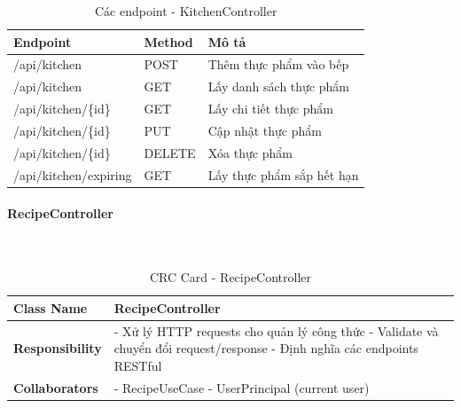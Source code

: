 \begin{table}[H]
\small
\renewcommand{\arraystretch}{1.3}
\begin{tabularx}{\textwidth}{|>{\raggedright\arraybackslash}p{4.5cm}|>{\raggedright\arraybackslash}p{2cm}|X|}
\hline
\rowcolor{gray!20}
\textbf{Endpoint} & \textbf{Method} & \textbf{Mô tả} \\
\hline
/api/kitchen & POST & Thêm thực phẩm vào bếp \\
\hline
/api/kitchen & GET & Lấy danh sách thực phẩm \\
\hline
/api/kitchen/\{id\} & GET & Lấy chi tiết thực phẩm \\
\hline
/api/kitchen/\{id\} & PUT & Cập nhật thực phẩm \\
\hline
/api/kitchen/\{id\} & DELETE & Xóa thực phẩm \\
\hline
/api/kitchen/expiring & GET & Lấy thực phẩm sắp hết hạn \\
\hline
\end{tabularx}
\caption{Các endpoint - KitchenController}
\end{table}

\paragraph{RecipeController} ~\\

\begin{table}[H]
\small
\renewcommand{\arraystretch}{1.3}
\begin{tabularx}{\textwidth}{|>{\raggedright\arraybackslash}p{3.5cm}|X|}
\hline
\rowcolor{gray!20}
\textbf{Class Name} & RecipeController \\
\hline
\textbf{Responsibility} & - Xử lý HTTP requests cho quản lý công thức \newline - Validate và chuyển đổi request/response \newline - Định nghĩa các endpoints RESTful \\
\hline
\textbf{Collaborators} & - RecipeUseCase \newline - UserPrincipal (current user) \\
\hline
\end{tabularx}
\caption{CRC Card - RecipeController}
\end{table}

